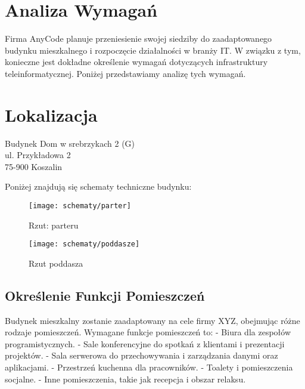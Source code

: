 \section{Analiza Wymagań}

Firma AnyCode planuje przeniesienie swojej siedziby do zaadaptowanego budynku mieszkalnego i rozpoczęcie działalności w branży IT. W związku z tym, konieczne jest dokładne określenie wymagań dotyczących infrastruktury teleinformatycznej. Poniżej przedstawiamy analizę tych wymagań.

\section{Lokalizacja}

    Budynek Dom w srebrzykach 2 (G) \\
    ul. Przykładowa 2\\
    75-900 Koszalin\\

    \begin{flushleft}
        Poniżej znajdują się schematy techniczne budynku: 

        \begin{figure}[!htb]
            \centering
            \begin{minipage}{0.8\textwidth}
                \centering
                \texttt{[image: schematy/parter]}
                \caption{Rzut: parteru}
            \end{minipage}
        \end{figure}

        \begin{figure}[!htb]
            \centering
            \begin{minipage}{0.8\textwidth}
                \centering
                \texttt{[image: schematy/poddasze]}
                \caption{Rzut poddasza}
            \end{minipage}
        \end{figure}

    \end{flushleft}


\subsection{Określenie Funkcji Pomieszczeń}

Budynek mieszkalny zostanie zaadaptowany na cele firmy XYZ, obejmując różne rodzaje pomieszczeń. Wymagane funkcje pomieszczeń to:
- Biura dla zespołów programistycznych.
- Sale konferencyjne do spotkań z klientami i prezentacji projektów.
- Sala serwerowa do przechowywania i zarządzania danymi oraz aplikacjami.
- Przestrzeń kuchenna dla pracowników.
- Toalety i pomieszczenia socjalne.
- Inne pomieszczenia, takie jak recepcja i obszar relaksu.

